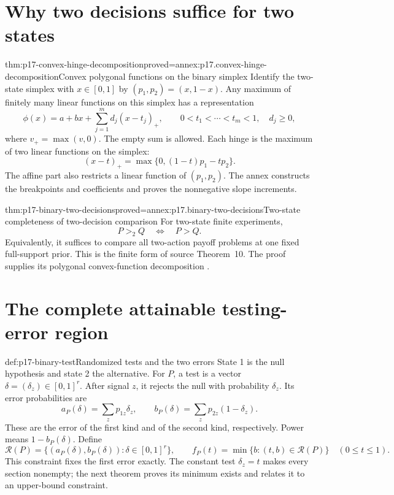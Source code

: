 \section{Why two decisions suffice for two states}
\label{sec:p17-two-state-comparison}

\begin{hblemma}{thm:p17-convex-hinge-decomposition}{proved=annex:p17.convex-hinge-decomposition}{Convex polygonal functions on the binary simplex}
Identify the two-state simplex with \(x\in[0,1]\) by
\((p_1,p_2)=(x,1-x)\). Any maximum of finitely many linear functions
on this simplex has a representation
\[
       \phi(x)=a+bx+\sum_{j=1}^m d_j(x-t_j)_+,
       \qquad
       0<t_1<\cdots<t_m<1,\quad d_j\geq0,
\]
where \(v_+=\max(v,0)\). The empty sum is allowed.
Each hinge is the maximum of two linear functions on the simplex:
\[
        (x-t)_+=\max\{0,(1-t)p_1-tp_2\}.
\]
The affine part also restricts a linear function of \((p_1,p_2)\).
The annex constructs the breakpoints and coefficients and proves the
nonnegative slope increments.
\end{hblemma}

\begin{hbtheorem}{thm:p17-binary-two-decisions}{proved=annex:p17.binary-two-decisions}{Two-state completeness of two-decision comparison}
For two-state finite experiments,
\[
                              P>_2Q\quad\Longleftrightarrow\quad P>Q.
\]
Equivalently, it suffices to compare all two-action payoff problems at
one fixed full-support prior. This is the finite form of source
Theorem~10. The proof supplies its polygonal convex-function decomposition
\cite[pp.~271--272]{Blackwell1953EquivalentExperiments}.
\end{hbtheorem}

\section{The complete attainable testing-error region}
\label{sec:p17-binary-testing-region}

\begin{hbdefinition}{def:p17-binary-test}{Randomized tests and the two errors}
State 1 is the null hypothesis and state 2 the alternative. For \(P\),
a test is a vector \(\delta=(\delta_z)\in[0,1]^r\).
After signal \(z\), it rejects the null with probability \(\delta_z\).
Its error probabilities are
\[
    a_P(\delta)=\sum_zp_{1z}\delta_z,\qquad
    b_P(\delta)=\sum_zp_{2z}(1-\delta_z).
\]
These are the error of the first kind and of the second kind, respectively.
Power means \(1-b_P(\delta)\). Define
\[
 \mathcal R(P)=\{(a_P(\delta),b_P(\delta)):\delta\in[0,1]^r\},
 \qquad
 f_P(t)=\min\{b:(t,b)\in\mathcal R(P)\}\quad(0\leq t\leq1).
\]
This constraint fixes the first error exactly. The constant test
\(\delta_z=t\) makes every section nonempty; the next theorem proves its
minimum exists and relates it to an upper-bound constraint.
\end{hbdefinition}

